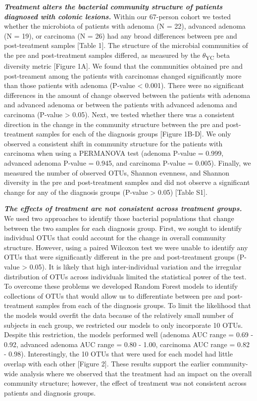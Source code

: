 \documentclass[12pt,]{article}
\begin{document}
\textbf{\emph{Treatment alters the bacterial community structure of
patients diagnosed with colonic lesions.}} Within our 67-person cohort
we tested whether the microbiota of patients with adenoma (N = 22),
advanced adenoma (N = 19), or carcinoma (N = 26) had any broad
differences between pre and post-treatment samples {[}Table 1{]}. The
structure of the microbial communities of the pre and post-treatment
samples differed, as measured by the \(\theta\)\textsubscript{YC} beta
diversity metric {[}Figure 1A{]}. We found that the communities obtained
pre and post-treament among the patients with carcinomas changed
significantly more than those patients with adenoma (P-value \textless{}
0.001). There were no significant differences in the amount of change
observed between the patients with adenoma and advanced adenoma or
between the patients with advanced adenoma and carcinoma (P-value
\textgreater{} 0.05). Next, we tested whether there was a consistent
direction in the change in the community structure between the pre and
post-treatment samples for each of the diagnosis groups {[}Figure
1B-D{]}. We only observed a consistent shift in community structure for
the patients with carcinoma when using a PERMANOVA test (adenoma P-value
= 0.999, advanced adenoma P-value = 0.945, and carcinoma P-value =
0.005). Finally, we measured the number of observed OTUs, Shannon
evenness, and Shannon diversity in the pre and post-treatment samples
and did not observe a significant change for any of the diagnosis groups
(P-value \textgreater{} 0.05) {[}Table S1{]}.

\textbf{\emph{The effects of treatment are not consistent across
treatment groups.}} We used two approaches to identify those bacterial
populations that change between the two samples for each diagnosis
group. First, we sought to identify individual OTUs that could account
for the change in overall community structure. However, using a paired
Wilcoxon test we were unable to identify any OTUs that were
significantly different in the pre and post-treatment groups (P-value
\textgreater{} 0.05). It is likely that high inter-individual variation
and the irregular distribution of OTUs across individuals limited the
statistical power of the test. To overcome these problems we developed
Random Forest models to identify collections of OTUs that would allow us
to differentiate between pre and post-treatment samples from each of the
diagnosis groups. To limit the likelihood that the models would overfit
the data because of the relatively small number of subjects in each
group, we restricted our models to only incorporate 10 OTUs. Despite
this restriction, the models performed well (adenoma AUC range = 0.69 -
0.92, advanced adenoma AUC range = 0.80 - 1.00, carcinoma AUC range =
0.82 - 0.98). Interestingly, the 10 OTUs that were used for each model
had little overlap with each other {[}Figure 2{]}. These results support
the earlier community-wide analysis where we observed that the treatment
had an impact on the overall community structure; however, the effect of
treatment was not consistent across patients and diagnosis groups.
\end{document}
